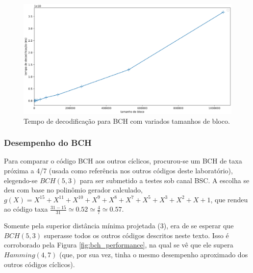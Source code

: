 \begin{figure}[!hb]
	\centering
    \captionsetup{justification=centering}
	\includegraphics[scale=0.3]{floats/bch-decode-is-linear.eps}
	\caption{\label{fig:bch_decoding_is_linear}Tempo de decodificação para BCH com variados tamanhos de bloco.}
\end{figure}

\subsubsection{\label{desempenho_bch}Desempenho do BCH}

Para comparar o código BCH aos outros cíclicos, procurou-se um BCH de taxa próxima a 4/7 (usada como referência nos outros códigos deste laboratório), elegendo-se $BCH(5, 3)$ para ser submetido a testes sob canal BSC. A escolha se deu com base no polinômio gerador calculado, $g(X)=X^{15}+X^{11}+X^{10}+X^9+X^8+X^7+X^5+X^3+X^2+X+1$, que rendeu ao código taxa $\frac{31-15}{31}\simeq 0.52\simeq \frac{4}{7}\simeq 0.57$.

Somente pela superior distância mínima projetada (3), era de se esperar que $BCH(5,3)$ superasse todos os outros códigos descritos neste texto. Isso é corroborado pela Figura \ref{fig:bch_performance}, na qual se vê que ele supera $Hamming(4,7)$ (que, por sua vez, tinha o mesmo desempenho aproximado dos outros códigos cíclicos).

